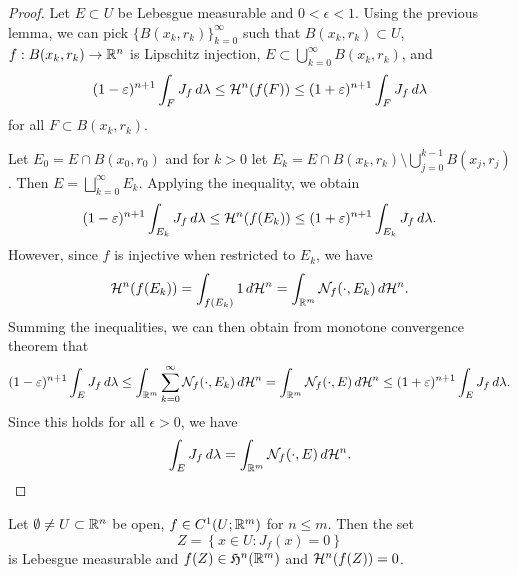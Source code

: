 \documentclass[a4paper]{article}
\renewcommand{\cupinfk}{\bigcup_{k=0}^\infty}
\renewcommand{\sqcupinfk}{\bigsqcup_{k=0}^\infty}
\renewcommand{\suminfk}{\sum_{k=0}^\infty}
\renewcommand{\seqinfk}[1]{\{ #1 \}_{k=0}^\infty}
\renewcommand{\cupj}{\bigcup_{j=0}}
\begin{document}
\begin{proof}
Let $E \subset U$ be Lebesgue measurable and $0 < \epsilon < 1$.
Using the previous lemma, we can pick $\seqinfk{B(x_k, r_k)}$
such that $B(x_k, r_k) \subset U$, $f : B(x_k, r_k) \to \mathbb{R}^n$
is Lipschitz injection, $E \subset \cupinfk B(x_k, r_k)$, and
\[
(1 - \varepsilon)^{n+1} \int_F J_f \, d \lambda
\leq \mathcal{H}^n (f(F))
\leq (1 + \varepsilon)^{n+1} \int_F J_f \, d \lambda
\]
for all $F \subset B(x_k, r_k)$.

Let $E_0 = E \cap B(x_0, r_0)$ and for $k > 0$ let
$E_k = E \cap B(x_k, r_k) \setminus \cupj^{k-1} B(x_j, r_j)$.
Then $E = \sqcupinfk E_k$. Applying the inequality, we obtain
\[
(1 - \varepsilon)^{n+1} \int_{E_k} J_f \, d \lambda
\leq \mathcal{H}^n (f(E_k))
\leq (1 + \varepsilon)^{n+1} \int_{E_k} J_f \, d \lambda.
\]
However, since $f$ is injective when restricted to $E_k$,
we have
\[
\mathcal{H}^n (f(E_k))
= \int_{f(E_k)} 1 \, d \mathcal{H}^n
= \int_{\mathbb{R}^m} \mathcal{N}_f(\cdot, E_k) \, d \mathcal{H}^n.
\]
Summing the inequalities, we can then obtain from monotone
convergence theorem that
\[
(1 - \epsilon)^{n+1} \int_E J_f \d \lambda
\leq \int_{\R^m} \suminfk \ncal_f(\cdot, E_k) \d \hcal^n
= \int_{\R^m} \ncal_f(\cdot, E) \d \hcal^n
\leq (1 + \epsilon)^{n+1} \int_E J_f \d \lambda.
\]
Since this holds for all $\epsilon > 0$, we have
\[
\int_E J_f \, d \lambda = \int_{\mathbb{R}^m} \mathcal{N}_f(\cdot, E) \, d \mathcal{H}^n.
\]
\end{proof}

\begin{thm}
Let $\emptyset \neq U \subset \mathbb{R}^n$ be open, $f \in C^1 (U;
\mathbb{R}^m)$ for $n \leq m$. Then the set
\[
Z = \left\{ x \in U: J_f(x) = 0 \right\}
\]
is Lebesgue measurable and $f(Z) \in \mathfrak{H}^n(\mathbb{R}^m)$ and
$\mathcal{H}^n (f(Z)) = 0$.
\end{thm}
\end{document}
